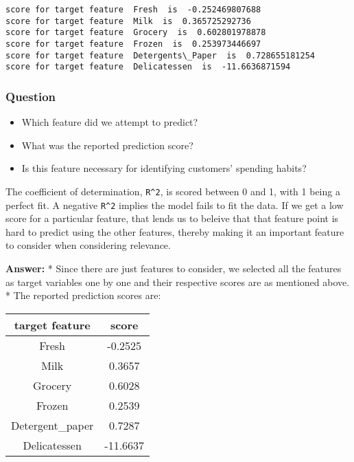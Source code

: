 \documentclass[11pt]{article}
\providecommand{\tightlist}{%
      \setlength{\itemsep}{0pt}\setlength{\parskip}{0pt}}
\begin{document}
    \begin{Verbatim}[commandchars=\\\{\}]
score for target feature  Fresh  is  -0.252469807688
score for target feature  Milk  is  0.365725292736
score for target feature  Grocery  is  0.602801978878
score for target feature  Frozen  is  0.253973446697
score for target feature  Detergents\_Paper  is  0.728655181254
score for target feature  Delicatessen  is  -11.6636871594

    \end{Verbatim}

    \subsubsection{Question}\label{question}

\begin{itemize}
\tightlist
\item
  Which feature did we attempt to predict?
\item
  What was the reported prediction score?
\item
  Is this feature necessary for identifying customers' spending habits?
\end{itemize}

The coefficient of determination, \texttt{R\^{}2}, is scored between 0
and 1, with 1 being a perfect fit. A negative \texttt{R\^{}2} implies
the model fails to fit the data. If we get a low score for a particular
feature, that lends us to beleive that that feature point is hard to
predict using the other features, thereby making it an important feature
to consider when considering relevance.

    \textbf{Answer:} * Since there are just features to consider, we
selected all the features as target variables one by one and their
respective scores are as mentioned above. * The reported prediction
scores are:

\begin{longtable}[]{@{}cc@{}}
\toprule
target feature & score\tabularnewline
\midrule
\endhead
Fresh & -0.2525\tabularnewline
Milk & 0.3657\tabularnewline
Grocery & 0.6028\tabularnewline
Frozen & 0.2539\tabularnewline
Detergent\_paper & 0.7287\tabularnewline
Delicatessen & -11.6637\tabularnewline
\bottomrule
\end{longtable}
\end{document}
